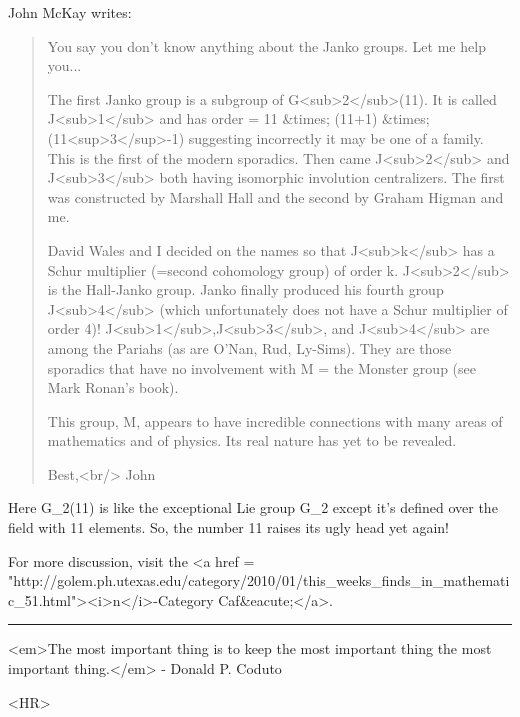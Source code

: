 John McKay writes:

\begin{quote}

   You say you don't know anything about the Janko groups. Let me 
   help you...

   The first Janko group is a subgroup of G<sub>2</sub>(11). It is
   called J<sub>1</sub> and has order = 11 &times; (11+1) &times;
   (11<sup>3</sup>-1) suggesting incorrectly it may be one of a
   family.  This is the first of the modern sporadics. Then came
   J<sub>2</sub> and J<sub>3</sub> both having isomorphic involution
   centralizers. The first was constructed by Marshall Hall and the
   second by Graham Higman and me.

   David Wales and I decided on the names so that J<sub>k</sub> has a
   Schur multiplier (=second cohomology group) of order k.
   J<sub>2</sub> is the Hall-Janko group.  Janko finally produced his
   fourth group J<sub>4</sub> (which unfortunately does not have a
   Schur multiplier of order 4)!  J<sub>1</sub>,J<sub>3</sub>, and
   J<sub>4</sub> are among the Pariahs (as are O'Nan, Rud, Ly-Sims).
   They are those sporadics that have no involvement with M = the
   Monster group (see Mark Ronan's book).

   This group, M, appears to have incredible connections with many
   areas of mathematics and of physics. Its real nature has yet to be
   revealed.

   Best,<br/>
   John
\end{quote}
    

Here G_{2}(11) is like the exceptional Lie group G_{2}
except it's defined over the field with 11 elements.  So, the number
11 raises its ugly head yet again!

For more discussion, visit the <a href = "http://golem.ph.utexas.edu/category/2010/01/this_weeks_finds_in_mathematic_51.html"><i>n</i>-Category Caf&eacute;</a>.

\par\noindent\rule{\textwidth}{0.4pt}
<em>The most important thing is to keep the most important thing the most
important thing.</em> - Donald P. Coduto

<HR>



